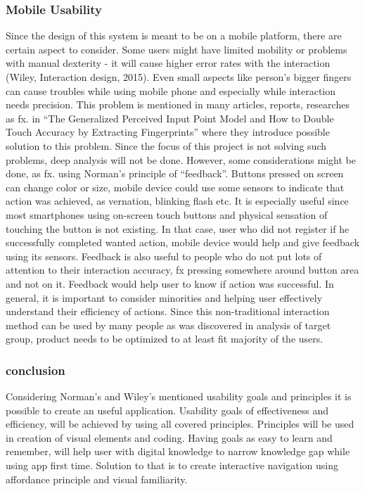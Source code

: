 \subsubsection{Mobile Usability}

Since the design of this system is meant to be on a mobile platform, there are certain aspect to consider. Some users might have limited mobility or problems with manual dexterity - it will cause higher error rates with the interaction (Wiley, Interaction design, 2015). Even small aspects like person’s bigger fingers can cause troubles while using mobile phone and especially while interaction needs precision. This problem is mentioned in many articles, reports, researches as fx. in “The Generalized Perceived Input Point Model and How to Double Touch Accuracy by Extracting Fingerprints” where they introduce possible solution to this problem. Since the focus of this project is not solving such problems, deep analysis will not be done. However, some considerations might be done, as fx. using Norman’s principle of “feedback”. Buttons pressed on screen can change color or size, mobile device could use some sensors to indicate that action was achieved, as vernation, blinking flash etc. It is especially useful since most smartphones using on-screen touch buttons and physical sensation of touching the button is not existing.  In that case, user who did not register if he successfully completed wanted action, mobile device would help and give feedback using its sensors. Feedback is also useful to people who do not put lots of attention to their interaction accuracy, fx pressing somewhere around button area and not on it. Feedback would help user to know if action was successful. 
In general, it is important to consider minorities and helping user effectively understand their efficiency of actions. Since this non-traditional interaction method can be used by many people as was discovered in analysis of target group, product needs to be optimized to at least fit majority of the users. 

\subsubsection{conclusion}

Considering Norman’s and Wiley’s mentioned usability goals and principles it is possible to create an useful application. Usability goals of effectiveness and efficiency, will be achieved by using all covered principles. Principles will be used in creation of visual elements and coding. Having goals as easy to learn and remember, will help user with digital knowledge to narrow knowledge gap while using app first time. Solution to that is to create interactive navigation using affordance principle and visual familiarity.



